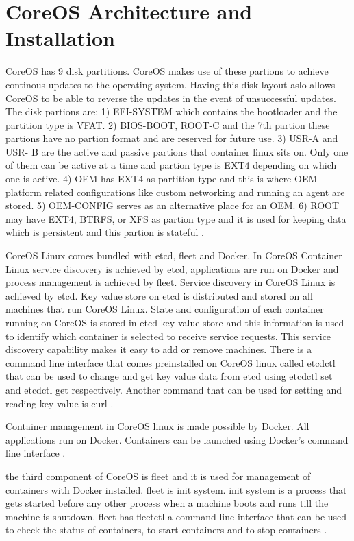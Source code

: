 \documentclass[9pt,twocolumn,twoside]{../../styles/osajnl}
\begin{document}
\section{CoreOS Architecture and Installation}

CoreOS has 9 disk partitions. CoreOS makes use of these partions to
achieve continous updates to the operating system. Having this disk
layout aslo allows CoreOS to be able to reverse the updates in the
event of unsuccessful updates. The disk partions are: 1) EFI-SYSTEM
which contains the bootloader and the partition type is VFAT. 2)
BIOS-BOOT, ROOT-C and the 7th partion these partions have no partion
format and are reserved for future use. 3) USR-A and USR- B are the
active and passive partions that container linux sits on. Only one of
them can be active at a time and partion type is EXT4 depending on
which one is active. 4) OEM has EXT4 as partition type and this is
where OEM platform related configurations like custom networking and
running an agent are stored. 5) OEM-CONFIG serves as an alternative
place for an OEM. 6) ROOT may have EXT4, BTRFS, or XFS as partion type
and it is used for keeping data which is persistent and this partion
is stateful \cite{www-core}.

CoreOS Linux comes bundled with etcd, fleet and Docker. In CoreOS
Container Linux service discovery is achieved by etcd, applications
are run on Docker and process management is achieved by fleet. Service
discovery in CoreOS Linux is achieved by etcd. Key value store on etcd
is distributed and stored on all machines that run CoreOS Linux.
State and configuration of each container running on CoreOS is stored
in etcd key value store and this information is used to identify which
container is selected to receive service requests. This service
discovery capability makes it easy to add or remove machines. There is
a command line interface that comes preinstalled on CoreOS linux
called etcdctl that can be used to change and get key value data from
etcd using etcdctl set and etcdctl get respectively. Another command
that can be used for setting and reading key value is curl
\cite{www-coreOSquickstart}.

Container management in CoreOS linux is made possible by Docker.  All
applications run on Docker. Containers can be launched using Docker's
command line interface \cite{www-coreOSquickstart}.

the third component of CoreOS is fleet and it is used for management
of containers with Docker installed. fleet is init system. init system
is a process that gets started before any other process when a machine
boots and runs till the machine is shutdown. fleet has fleetctl a
command line interface that can be used to check the status of
containers, to start containers and to stop containers
\cite{www-coreOSquickstart, www-wiki}.
\end{document}
